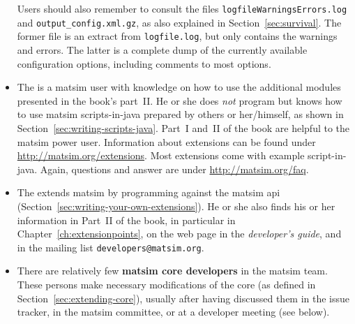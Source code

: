 \begin{itemize}
Users should also remember to consult the files \lstinline{logfileWarningsErrors.log} and \lstinline{output_config.xml.gz}, as also explained in Section~\ref{sec:survival}.  The former file is an extract from \lstinline{logfile.log}, but only contains the warnings and errors.  The latter is a complete dump of the currently available configuration options, including comments to most options.
%
\item The  is a \gls{matsim} user with knowledge on how to use the additional modules presented in the book's part~II. He or she does \emph{not} program but knows how to use \gls{matsim} scripts-in-\gls{java} prepared by others or her/himself, as shown in Section~\ref{sec:writing-scripts-java}. Part~I and~II of the book are helpful to the \gls{matsim} power user.  Information about \glspl{extension} can be found under \url{http://matsim.org/extensions}.  Most \glspl{extension} come with example script-in-\gls{java}.  Again, questions and answer are under \url{http://matsim.org/faq}.
%
\item The  extends \gls{matsim} by programming against the \gls{matsim} \gls{api} (Section~\ref{sec:writing-your-own-extensions}). He or she also finds his or her information in Part~II of the book, in particular in Chapter~\ref{ch:extensionpoints}, on the web page in 
the \emph{developer's guide}, and in the mailing list \lstinline|developers@matsim.org|.
%
%
\item There are relatively few \textbf{\gls{matsim} core developers} in the \gls{matsim} team. 
These 
persons make necessary modifications of the core (as defined in Section~\ref{sec:extending-core}), usually after having discussed them in the issue tracker, in the \gls{matsim} committee, or at a developer meeting (see below). 
%
\end{itemize}
%
